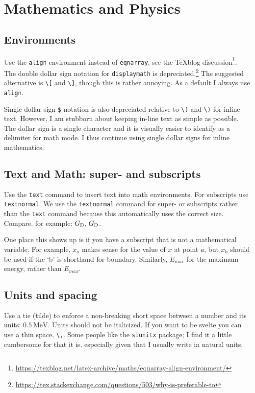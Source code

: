 \section{Mathematics and Physics}

\subsection{Environments}

Use the \texttt{align} environment instead of \texttt{eqnarray}, see the TeXblog discussion\footnote{\url{https://texblog.net/latex-archive/maths/eqnarray-align-environment/}}. The double dollar sign notation for \texttt{displaymath} is depreciated.\footnote{\url{https://tex.stackexchange.com/questions/503/why-is-preferable-to}} The suggested alternative is \verb!\[! and \verb!\]!, though this is rather annoying. As a default I always use \texttt{align}.

Single dollar sign \verb!$! notation is also depreciated relative to \verb!\(! and \verb!\)! for inline text. However, I am stubborn about keeping in-line text as simple as possible. The dollar sign is a single character and it is visually easier to identify as a delimiter for math mode. I thus continue using single dollar signs for inline mathematics. 


\subsection{Text and Math: super- and subscripts}

Use the \texttt{text} command to insert text into math environments. For subscripts use \texttt{textnormal}. 
% 
We use the \texttt{textnormal} command for super- or subscripts rather than the \texttt{text} command because this automatically uses the correct size. Compare, for example: $G_\textnormal{D},\, G_\text{D}$.

One place this shows up is if you have a subscript that is not a mathematical variable. For example, $x_a$ makes sense for the value of $x$ at point $a$, but $x_\text{b}$ should be used if the `b' is shorthand for boundary. Similarly, $E_\text{max}$ for the maximum energy, rather than $E_{max}$.


\subsection{Units and spacing}

Use a tie (tilde) to enforce a non-breaking short space between a number and its units: $0.5~\text{MeV}$. Units should not be italicized. If you want to be svelte you can use a thin space, \verb!\,!. Some people like the \texttt{siunitx} package; I find it a little cumbersome for that it is, especially given that I usually write in natural units.


